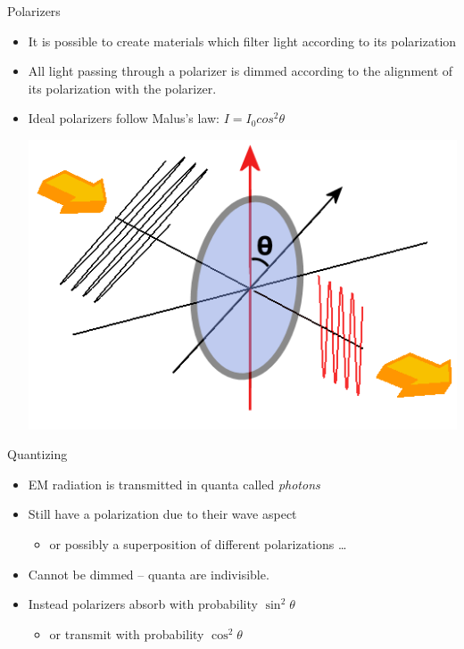 \documentclass[pdf]{beamer}
\begin{document}
\begin{frame}{Polarizers}
  \begin{itemize}
  \item It is possible to create materials which filter light according to its
    polarization
  \pause\item All light passing through a polarizer is dimmed according to the
    alignment of its polarization with the polarizer.
  \pause\item Ideal polarizers follow Malus's law: $I = I_0 cos^2 \theta$
    \begin{center}
      \includegraphics[scale=0.25]{images/Loi_de_malus.png}
    \end{center}
  \end{itemize}
\end{frame}
\begin{frame}{Quantizing}
  \begin{itemize}
  \item EM radiation is transmitted in quanta called \emph{photons}
  \pause\item Still have a polarization due to their wave aspect
    \begin{itemize}
    \item or possibly a superposition of different polarizations \ldots
    \end{itemize}
  \pause\item Cannot be dimmed -- quanta are indivisible.
  \pause\item Instead polarizers absorb with probability $\sin^2\theta$
    \begin{itemize}
    \item or transmit with probability $\cos^2\theta$
    \end{itemize}
  \end{itemize}
\end{frame}
\end{document}
